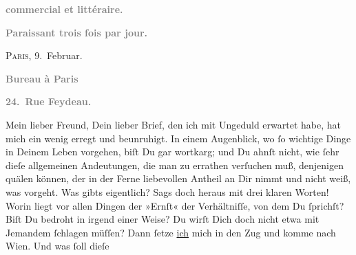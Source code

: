 \begin{ledgroupsized}[t]{13cm}
           \pstart
           \begin{otherlanguage}{french}\textcolor{gray}{\textbf{commercial et littéraire.}}\end{otherlanguage}\pend
           \pstart
           \begin{otherlanguage}{french}\textcolor{gray}{\textbf{\textbf{Paraissant trois fois par jour.}}}\end{otherlanguage}\hfill \textsc{Paris}, 9. Februar.\pend
           \pstart
           \begin{otherlanguage}{french}\textcolor{gray}{\textbf{\textbf{Bureau à Paris}}}\end{otherlanguage}\pend
           \pstart
           \begin{otherlanguage}{french}\textcolor{gray}{\textbf{\textbf{24. Rue Feydeau.}}}\end{otherlanguage}\pend
           \pstart\center{}Mein lieber Freund,\pend\pstart
           Dein lieber Brief, den ich mit Ungeduld \strikeout{\textcolor{gray}{e}\textcolor{gray}{×}} erwartet habe, hat mich ein wenig erregt und beunruhigt. In einem Augenblick,
               wo ſo wichtige Dinge in Deinem Leben vorgehen, biſt Du gar wortkarg; und Du ahnſt
               nicht, wie ſehr dieſe allgemeinen Andeutungen, die man zu errathen verſuchen muß,
               denjenigen quälen können, der in der Ferne liebevollen Antheil an Dir nimmt und nicht
               weiß, was vorgeht. Was gibts eigentlich? Sags doch heraus mit drei klaren Worten!
               Worin liegt vor allen Dingen der »Ernſt« {\pb}der
               Verhältniſſe, von dem Du ſprichſt? Biſt Du bedroht in irgend einer Weise? Du wirſt
               Dich doch nicht etwa mit Jemandem ſchlagen müſſen? Dann ſetze \uline{ich} mich in den Zug und komme nach Wien. Und was ſoll dieſe \label{K_L02802-1v}
\end{ledgroupsized}
